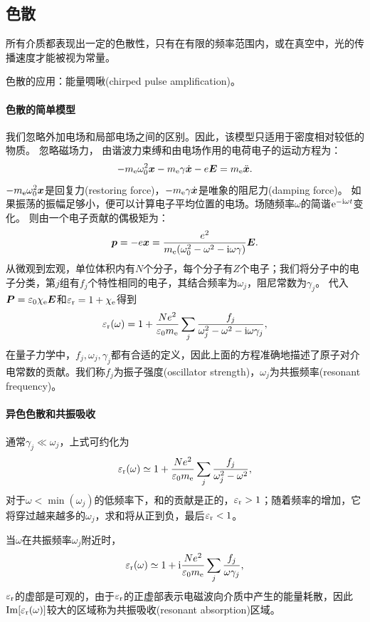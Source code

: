 \subsection{色散}
所有介质都表现出一定的色散性，只有在有限的频率范围内，或在真空中，光的传播速度才能被视为常量。

色散的应用：能量啁啾(chirped pulse amplification)。
\paragraph{色散的简单模型}
我们忽略外加电场和局部电场之间的区别。因此，该模型只适用于密度相对较低的物质。
忽略磁场力，
由谐波力束缚和由电场作用的电荷电子的运动方程为：
\[
    -m_\mathrm e\omega_0^2\bm x-m_\mathrm e\gamma\dot{\bm x}-e\bm E=m_\mathrm e\ddot{\bm x}.
\]
$-m_\mathrm e\omega_0^2\bm x$是回复力(restoring force)，$-m_\mathrm e\gamma\dot{\bm x}$是唯象的阻尼力(damping force)。
如果振荡的振幅足够小，便可以计算电子平均位置的电场。场随频率$\omega$的简谐$\mathop{}\!\mathrm{e}^{-\mathrm{i}\omega t}$变化。
则由一个电子贡献的偶极矩为：
\[
    \bm p=-e\bm x=\frac{e^2}{m_\mathrm e(\omega_0^2-\omega^2-\mathrm{i}\omega\gamma)}\bm E.
\]
从微观到宏观，单位体积内有$N$个分子，每个分子有$Z$个电子；我们将分子中的电子分类，第$j$组有$f_j$个特性相同的电子，其结合频率为$\omega_j$，阻尼常数为$\gamma_j$。
代入$\bm P=\varepsilon_0\chi_\mathrm e\bm E$和$\varepsilon_\text r=1+\chi_\mathrm e$得到
\begin{equation}
    \varepsilon_\text r(\omega)=1+\frac{Ne^2}{\varepsilon_0m_\mathrm e}\sum_j\frac{f_j}{\omega_j^2-\omega^2-\mathrm{i}\omega\gamma_j},
\end{equation}
在量子力学中，$f_j,\omega_j,\gamma_j$都有合适的定义，因此上面的方程准确地描述了原子对介电常数的贡献。我们称$f_j$为振子强度(oscillator strength)，$\omega_j$为共振频率(resonant frequency)。
\paragraph{异色色散和共振吸收}
通常$\gamma_j\ll\omega_j$，上式可约化为
\[
    \varepsilon_\text r(\omega)\simeq 1+\frac{Ne^2}{\varepsilon_0m_\mathrm e}\sum_j\frac{f_j}{\omega_j^2-\omega^2},
\]
对于$\omega<\min(\omega_j)$的低频率下，和的贡献是正的，$\varepsilon_\text r>1$；随着频率的增加，它将穿过越来越多的$\omega_j$，求和将从正到负，最后$\varepsilon_\text r<1$。

当$\omega$在共振频率$\omega_j$附近时，
\[
    \varepsilon_\text r(\omega)\simeq 1+\mathrm{i}\frac{Ne^2}{\varepsilon_0m_\mathrm e}\sum_j\frac{f_j}{\omega\gamma_j},
\]
$\varepsilon_\text r$的虚部是可观的，由于$\varepsilon_\text r$的正虚部表示电磁波向介质中产生的能量耗散，因此$\operatorname{Im}[\varepsilon_\text r(\omega)]$较大的区域称为共振吸收(resonant absorption)区域。

